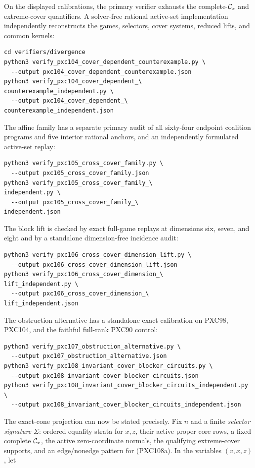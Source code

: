 \documentclass[11pt]{article}
\begin{document}
On the displayed calibrations, the primary verifier exhausts the
complete-\({\cal C}_x\) and extreme-cover quantifiers.  A solver-free rational
active-set implementation independently reconstructs the games, selectors,
cover systems, reduced lifts, and common kernels:
\begin{verbatim}
cd verifiers/divergence
python3 verify_pxc104_cover_dependent_counterexample.py \
  --output pxc104_cover_dependent_counterexample.json
python3 verify_pxc104_cover_dependent_\
counterexample_independent.py \
  --output pxc104_cover_dependent_\
counterexample_independent.json
\end{verbatim}
The affine family has a separate primary audit of all sixty-four endpoint
coalition programs and five interior rational anchors, and an independently
formulated active-set replay:
\begin{verbatim}
python3 verify_pxc105_cross_cover_family.py \
  --output pxc105_cross_cover_family.json
python3 verify_pxc105_cross_cover_family_\
independent.py \
  --output pxc105_cross_cover_family_\
independent.json
\end{verbatim}
The block lift is checked by exact full-game replays at dimensions six,
seven, and eight and by a standalone dimension-free incidence audit:
\begin{verbatim}
python3 verify_pxc106_cross_cover_dimension_lift.py \
  --output pxc106_cross_cover_dimension_lift.json
python3 verify_pxc106_cross_cover_dimension_\
lift_independent.py \
  --output pxc106_cross_cover_dimension_\
lift_independent.json
\end{verbatim}
The obstruction alternative has a standalone exact calibration on PXC98,
PXC104, and the faithful full-rank PXC90 control:
\begin{verbatim}
python3 verify_pxc107_obstruction_alternative.py \
  --output pxc107_obstruction_alternative.json
python3 verify_pxc108_invariant_cover_blocker_circuits.py \
  --output pxc108_invariant_cover_blocker_circuits.json
python3 verify_pxc108_invariant_cover_blocker_circuits_independent.py \
  --output pxc108_invariant_cover_blocker_circuits_independent.json
\end{verbatim}

The exact-cone projection can now be stated precisely.  Fix \(n\) and a
finite \emph{selector signature} \(\Sigma\): ordered equality strata for
\(x,z\), their active proper core rows, a fixed complete \({\cal C}_x\), the
active zero-coordinate normals, the qualifying extreme-cover supports, and
an edge/nonedge pattern for (PXC108a).  In the variables \((v,x,z)\), let
\end{document}
